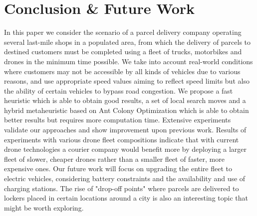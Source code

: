 \documentclass{article}
\begin{document}
	\section{Conclusion \& Future Work}
	In this paper we consider the scenario of a parcel delivery company operating several last-mile shops in a populated area, from which the delivery of parcels to destined customers must be completed using a fleet of trucks, motorbikes and drones in the minimum time possible. We take into account real-world conditions where customers may not be accessible by all kinds of vehicles due to various reasons, and use appropriate speed values aiming to reflect speed limits but also the ability of certain vehicles to bypass road congestion. We propose a fast heuristic which is able to obtain good results, a set of local search moves and a hybrid metaheuristic based on Ant Colony Optimization which is able to obtain better results but requires more computation time. Extensive experiments validate our approaches and show improvement upon previous work. Results of experiments with various drone fleet compositions indicate that with current drone technologies a courier company would benefit more by deploying a larger fleet of slower, cheaper drones rather than a smaller fleet of faster, more expensive ones. Our future work will focus on upgrading the entire fleet to electric vehicles, considering battery constraints and the availability and use of charging stations. The rise of "drop-off points" where parcels are delivered to lockers placed in certain locations around a city is also an interesting topic that might be worth exploring.
	\clearpage
	\onecolumn
\end{document}
